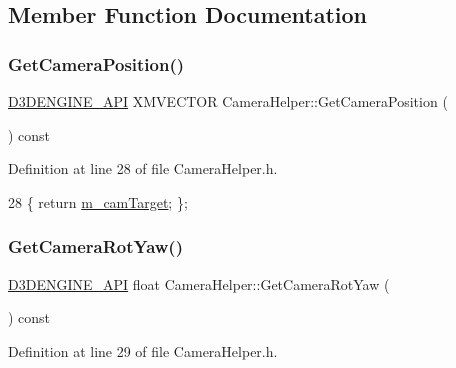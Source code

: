 \subsection{Member Function Documentation}
\mbox{\label{class_camera_helper_a26e57d260f821f47b9fd5ca456d25e7c}} 
\subsubsection{\texorpdfstring{Get\+Camera\+Position()}{GetCameraPosition()}}
{\footnotesize\ttfamily \mbox{\hyperlink{stdafx_8h_a8ee2d990c5dfba7794dd2b60741d7722}{D3\+D\+E\+N\+G\+I\+N\+E\+\_\+\+A\+PI}} X\+M\+V\+E\+C\+T\+OR Camera\+Helper\+::\+Get\+Camera\+Position (\begin{DoxyParamCaption}{ }\end{DoxyParamCaption}) const\hspace{0.3cm}{\ttfamily [inline]}}



Definition at line 28 of file Camera\+Helper.\+h.


\begin{DoxyCode}
28 \{ \textcolor{keywordflow}{return} \mbox{\hyperlink{class_camera_helper_abc1a814a0b54bfcb70f3e24bcd444f01}{m\_camTarget}}; \};
\end{DoxyCode}
\mbox{\label{class_camera_helper_a82e6dc2802d286a719c07b3d8484f139}} 
\subsubsection{\texorpdfstring{Get\+Camera\+Rot\+Yaw()}{GetCameraRotYaw()}}
{\footnotesize\ttfamily \mbox{\hyperlink{stdafx_8h_a8ee2d990c5dfba7794dd2b60741d7722}{D3\+D\+E\+N\+G\+I\+N\+E\+\_\+\+A\+PI}} float Camera\+Helper\+::\+Get\+Camera\+Rot\+Yaw (\begin{DoxyParamCaption}{ }\end{DoxyParamCaption}) const\hspace{0.3cm}{\ttfamily [inline]}}



Definition at line 29 of file Camera\+Helper.\+h.


